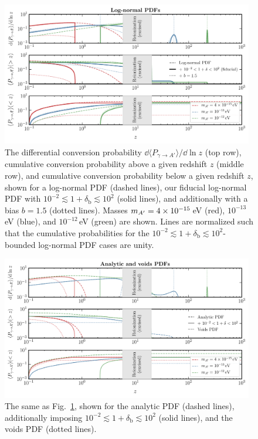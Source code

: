 \documentclass[prd,aps,10pt,nofootinbib,twocolumn,superscriptaddress,preprintnumbers,balancelastpage,longbibliography]{revtex4-1}
\begin{document}
%
\begin{figure}[htbp]
    \centering
    \includegraphics[width=0.98\textwidth]{plots/dP_dz_ln}
\caption{The differential conversion probability $\dd \langle P_{\gamma \to A'} \rangle/\dd\ln z$ (top row), cumulative conversion probability above a given redshift $z$ (middle row), and cumulative conversion probability below a given redshift $z$, shown for a log-normal PDF (dashed lines), our fiducial log-normal PDF with $10^{-2} \lesssim 1 + \delta_\text{b} \lesssim 10^2$ (solid lines), and additionally with a bias $b=1.5$ (dotted lines). Masses $m_{A^\prime} = 4\times10^{-15}$\,eV (red), $10^{-13}$\,eV (blue), and $10^{-12}$\,eV (green) are shown. Lines are normalized such that the cumulative probabilities for the $10^{-2} \lesssim 1 + \delta_\text{b} \lesssim 10^2$-bounded log-normal PDF cases are unity.~} 
    \label{fig:dP_dz_ln}
\end{figure}
%

%
\begin{figure}[htbp]
    \centering
    \includegraphics[width=0.98\textwidth]{plots/dP_dz_an}
    \caption{The same as Fig.~\ref{fig:dP_dz_ln}, shown for the analytic PDF (dashed lines), additionally imposing $10^{-2} \lesssim 1 + \delta_\text{b} \lesssim 10^2$ (solid lines), and the voids PDF (dotted lines).~} 
    \label{fig:dP_dz_an}
\end{figure}
%
\end{document}
